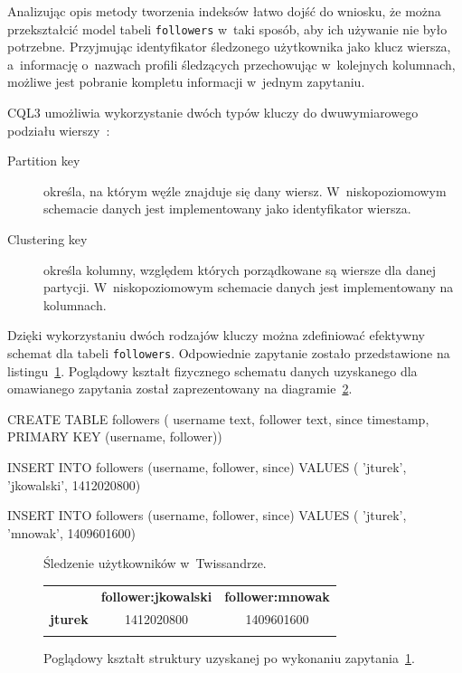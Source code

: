 Analizując opis metody tworzenia indeksów łatwo dojść do wniosku, że można przekształcić model tabeli \verb+followers+ w~taki sposób, aby ich używanie nie było potrzebne. Przyjmując identyfikator śledzonego użytkownika jako klucz wiersza, a~informację o~nazwach profili śledzących przechowując w~kolejnych kolumnach, możliwe jest pobranie kompletu informacji w~jednym zapytaniu. 

CQL3 umożliwia wykorzystanie dwóch typów kluczy do dwuwymiarowego podziału wierszy~\cite{compound_keys_and_clustering}:

\begin{description}
	\item[Partition key] określa, na którym węźle znajduje się dany wiersz. W~niskopoziomowym schemacie danych jest implementowany jako identyfikator wiersza.
	\item[Clustering key] określa kolumny, względem których porządkowane są wiersze dla danej partycji. W~niskopoziomowym schemacie danych jest implementowany na kolumnach.
\end{description}

Dzięki wykorzystaniu dwóch rodzajów kluczy można zdefiniować efektywny schemat dla tabeli \verb+followers+. Odpowiednie zapytanie zostało przedstawione na listingu~\ref{lst:following_users}. Poglądowy kształt fizycznego schematu danych uzyskanego dla omawianego zapytania został zaprezentowany na diagramie~\ref{tab:following_users_structure}.

\begin{verbbox}
CREATE TABLE followers (
    username text,
    follower text,
    since timestamp,
    PRIMARY KEY (username, follower))

INSERT INTO followers (username, follower, since) VALUES (
    'jturek',
    'jkowalski',
    1412020800)

INSERT INTO followers (username, follower, since) VALUES (
    'jturek',
    'mnowak',
    1409601600)
\end{verbbox}

\begin{figure}[ht!]
	\centering
	\theverbbox
	\caption{Śledzenie użytkowników w~Twissandrze.}
	\label{lst:following_users}
\end{figure}

\begin{figure}[ht!]
	\centering
	\begin{tabular}{|l||c|c|}
		\hhline{|-||--|}
		& \textbf{follower:jkowalski} & \textbf{follower:mnowak} \\
		\hhline{|~||==|}
		\textbf{jturek} & 1412020800 & 1409601600 \\
		\hhline{|-||--|}
	\end{tabular} 

	\caption{Poglądowy kształt struktury uzyskanej po wykonaniu zapytania~\ref{lst:following_users}.}
	\label{tab:following_users_structure}
\end{figure}

